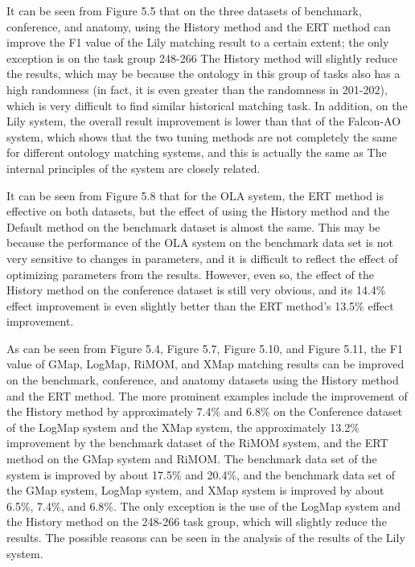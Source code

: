 \documentclass[twoside]{article}
\begin{document}
\begin{multicols}{2}
It can be seen from Figure 5.5 that on the three datasets of benchmark, conference, and anatomy, using the History method and the ERT method can improve the F1 value of the Lily matching result to a certain extent; the only exception is on the task group 248-266 The History method will slightly reduce the results, which may be because the ontology in this group of tasks also has a high randomness (in fact, it is even greater than the randomness in 201-202), which is very difficult to find similar historical matching task. 
In addition, on the Lily system, the overall result improvement is lower than that of the Falcon-AO system, which shows that the two tuning methods are not completely the same for different ontology matching systems, and this is actually the same as The internal principles of the system are closely related.

It can be seen from Figure 5.8 that for the OLA system, the ERT method is effective on both datasets, but the effect of using the History method and the Default method on the benchmark dataset is almost the same. 
This may be because the performance of the OLA system on the benchmark data set is not very sensitive to changes in parameters, and it is difficult to reflect the effect of optimizing parameters from the results. 
However, even so, the effect of the History method on the conference dataset is still very obvious, and its 14.4\% effect improvement is even slightly better than the ERT method's 13.5\% effect improvement.

As can be seen from Figure 5.4, Figure 5.7, Figure 5.10, and Figure 5.11, the F1 value of GMap, LogMap, RiMOM, and XMap matching results can be improved on the benchmark, conference, and anatomy datasets using the History method and the ERT method. The more prominent examples include the improvement of the History method by approximately 7.4\% and 6.8\% on the Conference dataset of the LogMap system and the XMap system, the approximately 13.2\% improvement by the benchmark dataset of the RiMOM system, and the ERT method on the GMap system and RiMOM. The benchmark data set of the system is improved by about 17.5\% and 20.4\%, and the benchmark data set of the GMap system, LogMap system, and XMap system is improved by about 6.5\%, 7.4\%, and 6.8\%. 
The only exception is the use of the LogMap system and the History method on the 248-266 task group, which will slightly reduce the results. The possible reasons can be seen in the analysis of the results of the Lily system.


\end{multicols}
\end{document}
